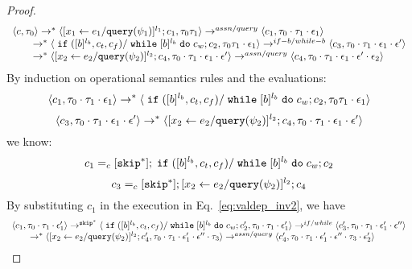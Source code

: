 {\begin{proof}
\begin{equation}
\begin{array}{l}
\langle {c}, \mathtt{\tau}_0 \rangle \rightarrow^{*} 
\langle [\mathrel{ {x}_1 \leftarrow e_1 / {\tt query}(\psi_1) }]^{l_1} ; {c}_1, \mathtt{\tau}_0 \mathtt{\tau}_1 \rangle  
\rightarrow^{assn/query}
 \langle c_1, \mathtt{\tau}_0 \cdot \mathtt{\tau}_1 \cdot \mathtt{\epsilon}_1 \rangle 
 \\
  \qquad \rightarrow^{*} 
  \langle \;\mathtt{if}\; ([b]^{l_b}, c_t, c_f) / \;\mathtt{while}\; [b]^{l_b} \;\mathtt{do}\; c_w;{c}_2, 
  \mathtt{\tau}_0 \mathtt{\tau}_1 \cdot \mathtt{\epsilon}_1 \rangle 
 \rightarrow^{if-b / while-b} 
  \langle c_3, 
  \mathtt{\tau}_0 \cdot \mathtt{\tau}_1 \cdot \mathtt{\epsilon}_1 \cdot \mathtt{\epsilon}' \rangle 
  \\
  \qquad   \rightarrow^{*} 
  \langle [\mathrel{ {x}_2 \leftarrow e_2 / {\tt query}(\psi_2) }]^{l_2};{c}_4, 
  \mathtt{\tau}_0 \cdot \mathtt{\tau}_1 \cdot \mathtt{\epsilon}_1 \cdot \mathtt{\epsilon}' \rangle 
  \rightarrow^{assn/query} 
  \langle {c}_4,  \mathtt{\tau}_0 \cdot \mathtt{\tau}_1 \cdot \mathtt{\epsilon}_1 \cdot \mathtt{\epsilon}' \cdot \mathtt{\epsilon}_2 \rangle 
\end{array}
\end{equation}
 By induction on operational semantics rules and the evaluations: 
 \[
  \langle c_1, \mathtt{\tau}_0 \cdot \mathtt{\tau}_1 \cdot \mathtt{\epsilon}_1 \rangle 
  \rightarrow^{*} 
  \langle \;\mathtt{if}\; ([b]^{l_b}, c_t, c_f) / \;\mathtt{while}\; [b]^{l_b} \;\mathtt{do}\; c_w;{c}_2, 
  \mathtt{\tau}_0 \mathtt{\tau}_1 \cdot \mathtt{\epsilon}_1 \rangle 
 \]
 \[
 \langle c_3, 
  \mathtt{\tau}_0 \cdot \mathtt{\tau}_1 \cdot \mathtt{\epsilon}_1 \cdot \mathtt{\epsilon}' \rangle 
  \rightarrow^{*} 
  \langle [\mathrel{ {x}_2 \leftarrow e_2 / {\tt query}(\psi_2) }]^{l_2};{c}_4, 
  \mathtt{\tau}_0 \cdot \mathtt{\tau}_1 \cdot \mathtt{\epsilon}_1 \cdot \mathtt{\epsilon}' \rangle 
 \]
 we know:
 \[
 c_1 =_c 
 [\mathtt{skip}^*]; \;\mathtt{if}\; ([b]^{l_b}, c_t, c_f) / \;\mathtt{while}\; [b]^{l_b} \;\mathtt{do}\; c_w;{c}_2
 \]
  \[
 c_3 =_c 
 [\mathtt{skip}^*]; [\mathrel{ {x}_2 \leftarrow e_2 / {\tt query}(\psi_2) }]^{l_2};{c}_4
 \]
By substituting $c_1$ in the execution in Eq.~\ref{eq:valdep_inv2}, we have 
\begin{equation}
\label{eq:m1test_inv2}
  \begin{array}{l}   
  \config{c_1, \vtrace_0 \cdot \vtrace_1 \cdot \event_1'} 
  \rightarrow^{\eskip^*} 
  \config{\eif ([b]^{l_b}, c_t, c_f) / \ewhile [b]^{l_b} \edo c_w ; {c}_2', \vtrace_0 \cdot \vtrace_1 \cdot \event_1'} 
  \rightarrow^{if / while} 
  \config{c_3', \vtrace_0 \cdot \vtrace_1 \cdot \event_1' \cdot \event''} 
  \\
  \qquad \rightarrow^{*} 
  \config{[\assign{{x}_2}{\expr_2 / \query(\qexpr_2)}]^{l_2};{c}_4', 
  \vtrace_0 \cdot \vtrace_1 \cdot \event_1' \cdot \event'' \cdot \trace_3}
  \rightarrow^{assn/query} 
  \config{{c}_4',  \vtrace_0 \cdot \vtrace_1 \cdot \event_1' \cdot \event'' \cdot \trace_3 \cdot \event_2'} 
\end{array}

\end{equation}
\end{proof}}
